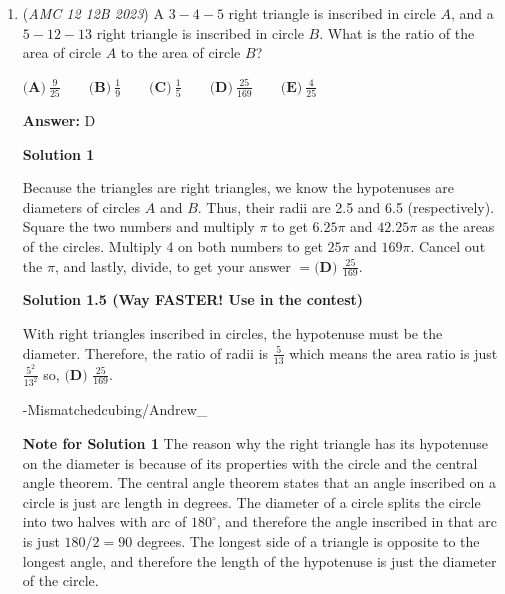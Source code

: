 \begin{enumerate}
 $D$ gives $47 \cdot 0.86 = \text{\$40.42}$,

 And $E$ gives $49 \cdot 0.86 = \text{\$42.14}$.

 Therefore, our answer is $\boxed{\textbf{(B) }50}$



	\item (\textit{AMC 12 12B 2023}) A $3-4-5$ right triangle is inscribed in circle $A$, and a $5-12-13$ right triangle is inscribed in circle $B$. What is the ratio of the area of circle $A$ to the area of circle $B$?


 $\textbf{(A)}~\frac{9}{25}\qquad\textbf{(B)}~\frac{1}{9}\qquad\textbf{(C)}~\frac{1}{5}\qquad\textbf{(D)}~\frac{25}{169}\qquad\textbf{(E)}~\frac{4}{25}$

 \textbf{Answer: }D



\textbf{Solution 1}

Because the triangles are right triangles, we know the hypotenuses are diameters of circles $A$ and $B$. Thus, their radii are 2.5 and 6.5 (respectively). Square the two numbers and multiply $\pi$ to get $6.25\pi$ and $42.25\pi$ as the areas of the circles. Multiply 4 on both numbers to get $25\pi$ and $169\pi$. Cancel out the $\pi$, and lastly, divide, to get your answer $=\boxed{\textbf{(D) }\frac{25}{169}}.$




\textbf{Solution 1.5 (Way FASTER! Use in the contest)}

With right triangles inscribed in circles, the hypotenuse must be the diameter. Therefore, the ratio of radii is $\frac{5}{13}$  which means the  area ratio is just $\frac{5^2}{13^2}$  so,  $\boxed{\textbf{(D) }\frac{25}{169}}.$

 -Mismatchedcubing/Andrew\_

 \textbf{Note for Solution 1} The reason why the right triangle has its hypotenuse on the diameter is because of its properties with the circle and the central angle theorem. The central angle theorem states that an angle inscribed on a circle is just arc length in degrees. The diameter of a circle splits the circle into two halves with arc of \( 180^\circ \), and therefore the angle inscribed in that arc is just \( 180/2 = 90 \) degrees. The longest side of a triangle is opposite to the longest angle, and therefore the length of the hypotenuse is just the diameter of the circle.

 




\end{enumerate}
